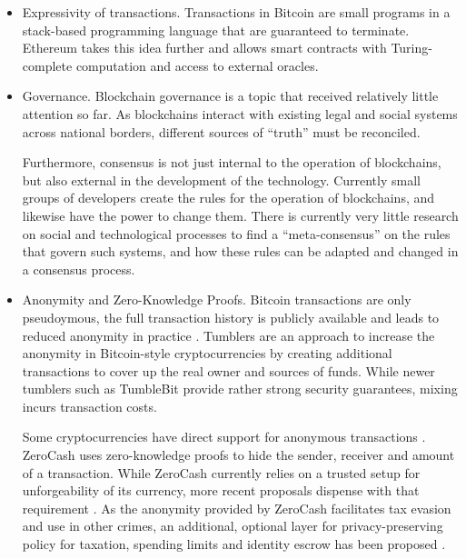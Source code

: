 \begin{itemize}
  \item Expressivity of transactions.  Transactions in Bitcoin are small programs
    in a stack-based programming language that are guaranteed to terminate.
    Ethereum \cite{wood2014ethereum} takes this idea further and allows smart contracts with
    Turing-complete computation and access to external oracles.

  \item Governance.  Blockchain governance \cite{reijers2016governance,levy2017book} is a
    topic that received relatively little attention so far.  As blockchains
    interact with existing legal and social systems across national borders,
    different sources of ``truth'' must be reconciled.

    Furthermore, consensus is not just internal to the operation of
    blockchains, but also external in the development of the technology.
    Currently small groups of developers create the rules for the operation of
    blockchains, and likewise have the power to change them.  There is
    currently very little research on social and technological processes to
    find a ``meta-consensus'' on the rules that govern such systems, and how
    these rules can be adapted and changed in a consensus process.

  \item Anonymity and Zero-Knowledge Proofs.  Bitcoin transactions are only
    pseudoymous, the full transaction history is publicly available and leads
    to reduced anonymity in practice \cite{reid2013analysis}.  Tumblers
    \cite{bonneau2014mixcoin,heilman2017tumblebit} are an approach to increase
    the anonymity in Bitcoin-style cryptocurrencies by creating additional
    transactions to cover up the real owner and sources of funds.  While newer tumblers
    such as TumbleBit \cite{heilman2017tumblebit} provide rather strong security guarantees,
    mixing incurs transaction costs.

    Some cryptocurrencies have direct support for anonymous transactions
    \cite{sun2017ringct}.  ZeroCash \cite{bensasson2014zerocash} uses
    zero-knowledge proofs to hide the sender, receiver and amount of a
    transaction.  While ZeroCash currently relies on a trusted setup for
    unforgeability of its currency, more recent proposals dispense with that
    requirement \cite{ben2018scalable,wahby2018doubly}.  As the anonymity
    provided by ZeroCash facilitates tax evasion and use in other crimes, an
    additional, optional layer for privacy-preserving policy for taxation,
    spending limits and identity escrow has been proposed
    \cite{garman2016accountable}.
\end{itemize}

